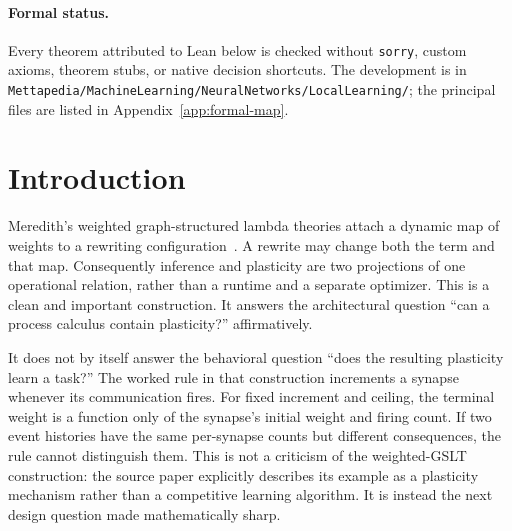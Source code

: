 \documentclass[11pt]{article}
\newcommand{\GSLT}{\textup{GSLT}}
\newcommand{\code}[1]{\texttt{#1}}
\newcommand{\codepath}[1]{\nolinkurl{#1}}
\begin{document}
\begin{abstract}
direct pure-rho compiler.  Finally, an additive stochastic valuation of
indexed rho communication occurrences realizes the quantized efficacy exactly
as transition hazard.  The valuation satisfies finite sum and independent
product laws, agrees with the existing WM-PLN evidence total, and normalizes to
a race distribution under explicit finite nonzero hypotheses.  A bare target
receiver can still steal a metabolic message, but is excluded from the typed
resource-image frame.  Thus the translation gives exact operational
correspondence for compiler-generated deployments, a closed success contract,
and a constructed rate realization for receipt-observable tasks, not a
full-abstraction claim for arbitrary target contexts or arbitrary stochastic
rho environments.
\end{abstract}

\paragraph{Formal status.}
Every theorem attributed to Lean below is checked without \code{sorry}, custom
axioms, theorem stubs, or native decision shortcuts.  The development is in
\codepath{Mettapedia/MachineLearning/NeuralNetworks/LocalLearning/}; the
principal files are listed in Appendix~\ref{app:formal-map}.

\section{Introduction}
\label{sec:introduction}

Meredith's weighted graph-structured lambda theories attach a dynamic map of
weights to a rewriting configuration~\cite{meredith2026weighted}.  A rewrite
may change both the term and that map.  Consequently inference and plasticity
are two projections of one operational relation, rather than a runtime and a
separate optimizer.  This is a clean and important construction.  It answers
the architectural question ``can a process calculus contain plasticity?''
affirmatively.

It does not by itself answer the behavioral question ``does the resulting
plasticity learn a task?''  The worked rule in that construction increments a
synapse whenever its communication fires.  For fixed increment and ceiling,
the terminal weight is a function only of the synapse's initial weight and
firing count.  If two event histories have the same per-synapse counts but
different consequences, the rule cannot distinguish them.  This is not a
criticism of the weighted-\GSLT{} construction: the source paper explicitly
describes its example as a plasticity mechanism rather than a competitive
learning algorithm.  It is instead the next design question made mathematically
sharp.
\end{document}
